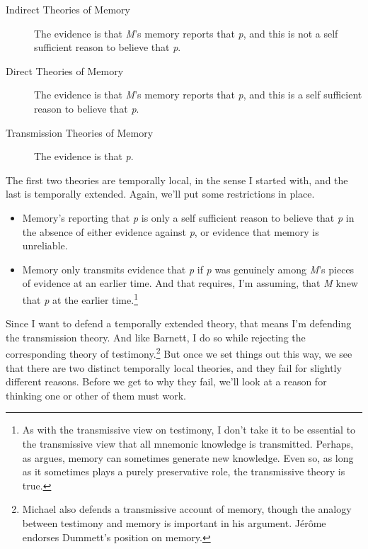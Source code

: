 \begin{description}

\item[Indirect Theories of Memory]

The evidence is that \emph{M}'s memory reports that \emph{p}, and this is not a self sufficient reason to believe that \emph{p}.

\item[Direct Theories of Memory]

The evidence is that \emph{M}'s memory reports that \emph{p}, and this is a self sufficient reason to believe that \emph{p}.

\item[Transmission Theories of Memory]

The evidence is that \emph{p}.
\end{description}

The first two theories are temporally local, in the sense I started with, and the last is temporally extended. Again, we'll put some restrictions in place.

\begin{itemize}
\item Memory's reporting that \emph{p} is only a self sufficient reason to believe that \emph{p} in the absence of either evidence against \emph{p}, or evidence that memory is unreliable.

\item Memory only transmits evidence that \emph{p} if \emph{p} was genuinely among \emph{M}'s pieces of evidence at an earlier time. And that requires, I'm assuming, that \emph{M} knew that \emph{p} at the earlier time.\footnote{As with the transmissive view on testimony, I don't take it to be essential to the transmissive view that all mnemonic knowledge is transmitted. Perhaps, as  \citet{Lackey2005} argues, memory can sometimes generate new knowledge. Even so, as long as it sometimes plays a purely preservative role, the transmissive theory is true.}

\end{itemize}
Since I want to defend a temporally extended theory, that means I'm defending the transmission theory. And like Barnett, I do so while rejecting the corresponding theory of testimony.\footnote{Michael  \citet{Dummett1994} also defends a transmissive account of memory, though the analogy between testimony and memory is important in his argument. Jérôme  \citet{Dokic2001} endorses Dummett's position on memory.} But once we set things out this way, we see that there are two distinct temporally local theories, and they fail for slightly different reasons. Before we get to why they fail, we'll look at a reason for thinking one or other of them must work.

